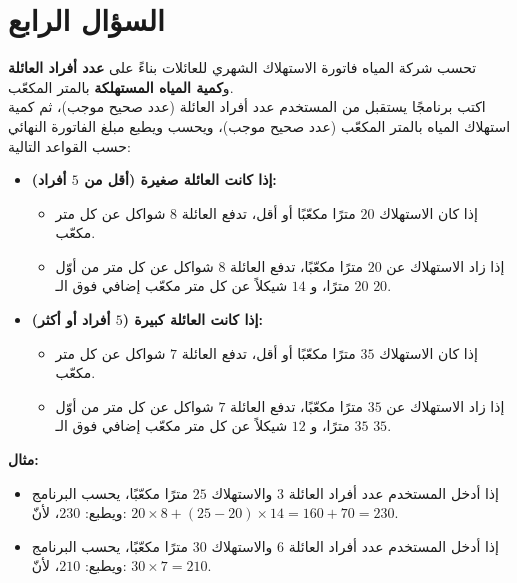 \documentclass[14pt]{extarticle}
\begin{document}
\section{السؤال الرابع}
تحسب شركة المياه فاتورة الاستهلاك الشهري للعائلات بناءً على \textbf{عدد أفراد العائلة} و\textbf{كمية المياه المستهلكة} بالمتر المكعّب. \\
اكتب برنامجًا يستقبل من المستخدم عدد أفراد العائلة (عدد صحيح موجب)، ثم كمية استهلاك المياه بالمتر المكعّب (عدد صحيح موجب)، ويحسب ويطبع مبلغ الفاتورة النهائي حسب القواعد التالية:
\begin{itemize}
    \item \textbf{إذا كانت العائلة صغيرة (أقل من $5$ أفراد):}
    \begin{itemize}[nosep]
        \item إذا كان الاستهلاك $20$ مترًا مكعّبًا أو أقل، تدفع العائلة $8$ شواكل عن كل متر مكعّب.
        \item إذا زاد الاستهلاك عن $20$ مترًا مكعّبًا، تدفع العائلة $8$ شواكل عن كل متر من أوّل $20$ مترًا، و $14$ شيكلاً عن كل متر مكعّب إضافي فوق الـ $20$.
    \end{itemize}
    \item \textbf{إذا كانت العائلة كبيرة ($5$ أفراد أو أكثر):}
    \begin{itemize}[nosep]
        \item إذا كان الاستهلاك $35$ مترًا مكعّبًا أو أقل، تدفع العائلة $7$ شواكل عن كل متر مكعّب.
        \item إذا زاد الاستهلاك عن $35$ مترًا مكعّبًا، تدفع العائلة $7$ شواكل عن كل متر من أوّل $35$ مترًا، و $12$ شيكلاً عن كل متر مكعّب إضافي فوق الـ $35$.
    \end{itemize}
\end{itemize}

\textbf{مثال:}
\begin{itemize}[nosep]
    \item إذا أدخل المستخدم عدد أفراد العائلة $3$ والاستهلاك $25$ مترًا مكعّبًا، يحسب البرنامج ويطبع: $230$، لأنّ:
    $20 \times 8 + (25 - 20) \times 14 = 160 + 70 = 230$.
    \item إذا أدخل المستخدم عدد أفراد العائلة $6$ والاستهلاك $30$ مترًا مكعّبًا، يحسب البرنامج ويطبع: $210$، لأنّ:
    $30 \times 7 = 210$.
\end{itemize}
\end{document}
